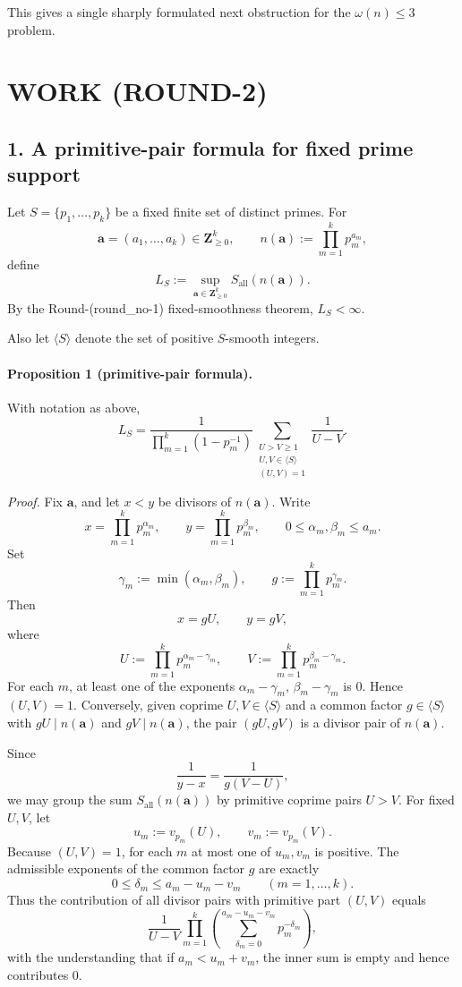 This gives a single sharply formulated next obstruction for the \(\omega(n)\le 3\) problem.

\section{WORK (ROUND-2)}

\subsection*{1. A primitive-pair formula for fixed prime support}

Let \(S=\{p_1,\dots,p_k\}\) be a fixed finite set of distinct primes. For
\[
\mathbf a=(a_1,\dots,a_k)\in \mathbf Z_{\ge 0}^k,
\qquad
n(\mathbf a):=\prod_{m=1}^k p_m^{a_m},
\]
define
\[
L_S:=\sup_{\mathbf a\in \mathbf Z_{\ge 0}^k} S_{\mathrm{all}}(n(\mathbf a)).
\]
By the Round-(round\_no-1) fixed-smoothness theorem, \(L_S<\infty\).

Also let \(\langle S\rangle\) denote the set of positive \(S\)-smooth integers.

\paragraph{Proposition 1 (primitive-pair formula).}
With notation as above,
\[
L_S=
\frac{1}{\prod_{m=1}^k(1-p_m^{-1})}
\sum_{\substack{U>V\ge 1\\ U,V\in \langle S\rangle\\ (U,V)=1}}
\frac{1}{U-V}.
\]

\emph{Proof.}
Fix \(\mathbf a\), and let \(x<y\) be divisors of \(n(\mathbf a)\). Write
\[
x=\prod_{m=1}^k p_m^{\alpha_m},
\qquad
y=\prod_{m=1}^k p_m^{\beta_m},
\qquad
0\le \alpha_m,\beta_m\le a_m.
\]
Set
\[
\gamma_m:=\min(\alpha_m,\beta_m),
\qquad
g:=\prod_{m=1}^k p_m^{\gamma_m}.
\]
Then
\[
x=gU,\qquad y=gV,
\]
where
\[
U:=\prod_{m=1}^k p_m^{\alpha_m-\gamma_m},
\qquad
V:=\prod_{m=1}^k p_m^{\beta_m-\gamma_m}.
\]
For each \(m\), at least one of the exponents \(\alpha_m-\gamma_m\), \(\beta_m-\gamma_m\) is \(0\). Hence \((U,V)=1\). Conversely, given coprime \(U,V\in\langle S\rangle\) and a common factor \(g\in\langle S\rangle\) with \(gU\mid n(\mathbf a)\) and \(gV\mid n(\mathbf a)\), the pair \((gU,gV)\) is a divisor pair of \(n(\mathbf a)\).

Since
\[
\frac{1}{y-x}=\frac{1}{g(V-U)},
\]
we may group the sum \(S_{\mathrm{all}}(n(\mathbf a))\) by primitive coprime pairs \(U>V\). For fixed \(U,V\), let
\[
u_m:=v_{p_m}(U),\qquad v_m:=v_{p_m}(V).
\]
Because \((U,V)=1\), for each \(m\) at most one of \(u_m,v_m\) is positive. The admissible exponents of the common factor \(g\) are exactly
\[
0\le \delta_m\le a_m-u_m-v_m
\qquad (m=1,\dots,k).
\]
Thus the contribution of all divisor pairs with primitive part \((U,V)\) equals
\[
\frac{1}{U-V}
\prod_{m=1}^k
\left(
\sum_{\delta_m=0}^{a_m-u_m-v_m} p_m^{-\delta_m}
\right),
\]
with the understanding that if \(a_m<u_m+v_m\), the inner sum is empty and hence contributes \(0\).

